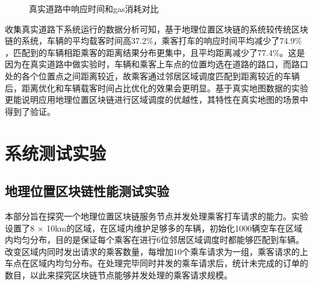 \begin{figure}[h]
  \centering
  \caption{真实道路中响应时间和gas消耗对比}
  \label{fig:real_manageGas}
\end{figure}

收集真实道路下系统运行的数据分析可知，基于地理位置区块链的系统较传统区块链的系统，车辆的平均载客时间高37.2$\%$，乘客打车的响应时间平均减少了74.9$\%$，匹配到的车辆相距乘客的距离结果分布更集中，且平均距离减少了77.4$\%$。这是因为在真实道路中做实验时，车辆和乘客上车点的位置均选在道路的路口，而路口处的各个位置点之间距离较近，故乘客通过邻居区域调度匹配到距离较近的车辆后，距离优化和车辆载客时间占比优化的效果会更明显。基于真实地图数据的实验更能说明应用地理位置区块链进行区域调度的优越性，其特性在真实地图的场景中得到了验证。

\section{系统测试实验}
\subsection{地理位置区块链性能测试实验}
本部分旨在探究一个地理位置区块链服务节点并发处理乘客打车请求的能力。实验设置了8 × 10km的区域，在区域内维护足够多的车辆，初始化1000辆空车在区域内均匀分布，目的是保证每个乘客在进行6位邻居区域调度时都能够匹配到车辆。改变区域内同时发出请求的乘客数量，每增加10个乘车请求为一组，乘客请求的上车点在区域内均匀分布。在处理完毕同时并发的乘车请求后，统计未完成的订单的数目，以此来探究区块链节点能够并发处理的乘客请求规模。

